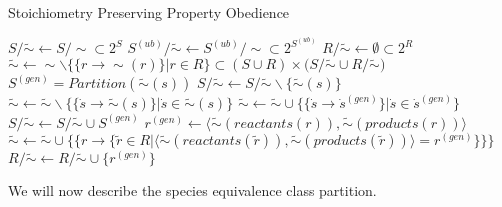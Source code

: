 \documentclass[10pt]{bmc_article}
\newenvironment{bmcformat}{\baselineskip20pt\sloppy\setboolean{publ}{false}}{\baselineskip20pt\sloppy}
\begin{document}
\begin{bmcformat}
\begin{algorithm}[H]
\SetAlgoVlined
{}
\caption{Stoichiometry Preserving Property Obedience}
\BlankLine
$S/\tilde{\sim} \leftarrow S/\sim \subset 2^S$ \;
$S^{(ub)}/\tilde{\sim} \leftarrow S^{(ub)}/\sim \subset 2^{S^{(ub)}}$ \;
$R/\tilde{\sim} \leftarrow \emptyset \subset 2^R$ \;
$\tilde{\sim} \leftarrow \sim \backslash \{\{r \rightarrow \sim(r)\}|r \in R\} \subset (S\cup{R})\times(S/\tilde{\sim}\cup{R/\tilde{\sim})}$ \;
\BlankLine
{} {
	$S^{(gen)} = Partition(\tilde{\sim}(s))$ \;
	$S/\tilde{\sim} \leftarrow S/\tilde{\sim}\backslash\{\tilde{\sim}(s)\}$ \;
	$\tilde{\sim} \leftarrow \tilde{\sim}\backslash\{\{\dot{s}  \rightarrow \tilde{\sim}(s)\}|\dot{s} \in \tilde{\sim}(s)\}$ \;
	 {
		$\tilde{\sim} \leftarrow \tilde{\sim}\cup\{\{\dot{s} \rightarrow \dot{s}^{(gen)}\}|\dot{s} \in \dot{s}^{(gen)}\}$ \;
	}
	$S/\tilde{\sim} \leftarrow S/\tilde{\sim}\cup{S^{(gen)}}$ \;
}
\BlankLine
{} {
	$r^{(gen)} \leftarrow \langle\tilde{\sim}(reactants(r)), \tilde{\sim}(products(r))\rangle$ \;	
	$\tilde{\sim} \leftarrow \tilde{\sim} \cup \{\{r \rightarrow \{\tilde{r} \in R|\langle\tilde{\sim}(reactants(\tilde{r})), \tilde{\sim}(products(\tilde{r}))\rangle = r^{(gen)}\}\}\}$ \;
	$R/\tilde{\sim} \leftarrow R/\tilde{\sim}\cup\{r^{(gen)}\}$ \;
}
\BlankLine
{}
\end{algorithm} 

We will now describe the species equivalence class partition.


\end{bmcformat}
\end{document}
